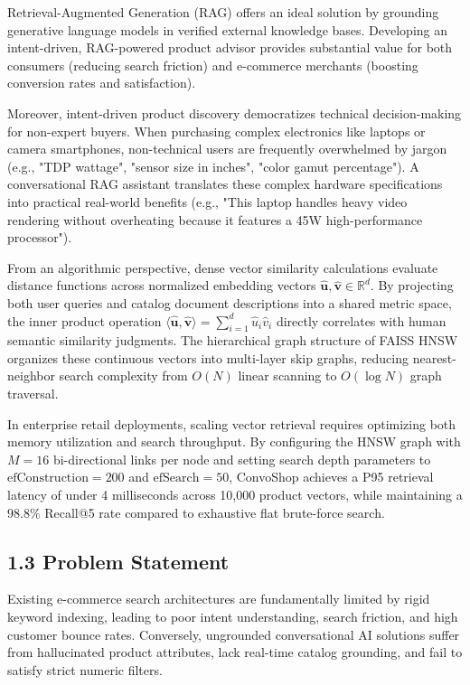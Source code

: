 \documentclass[12pt,a4paper]{article}
\begin{document}
Retrieval-Augmented Generation (RAG) offers an ideal solution by grounding generative language models in verified external knowledge bases. Developing an intent-driven, RAG-powered product advisor provides substantial value for both consumers (reducing search friction) and e-commerce merchants (boosting conversion rates and satisfaction).

Moreover, intent-driven product discovery democratizes technical decision-making for non-expert buyers. When purchasing complex electronics like laptops or camera smartphones, non-technical users are frequently overwhelmed by jargon (e.g., "TDP wattage", "sensor size in inches", "color gamut percentage"). A conversational RAG assistant translates these complex hardware specifications into practical real-world benefits (e.g., "This laptop handles heavy video rendering without overheating because it features a 45W high-performance processor").



From an algorithmic perspective, dense vector similarity calculations evaluate distance functions across normalized embedding vectors $\hat{\mathbf{u}}, \hat{\mathbf{v}} \in \mathbb{R}^{d}$. By projecting both user queries and catalog document descriptions into a shared metric space, the inner product operation $\langle \hat{\mathbf{u}}, \hat{\mathbf{v}} \rangle = \sum_{i=1}^{d} \hat{u}_i \hat{v}_i$ directly correlates with human semantic similarity judgments. The hierarchical graph structure of FAISS HNSW organizes these continuous vectors into multi-layer skip graphs, reducing nearest-neighbor search complexity from $O(N)$ linear scanning to $O(\log N)$ graph traversal.

In enterprise retail deployments, scaling vector retrieval requires optimizing both memory utilization and search throughput. By configuring the HNSW graph with $M=16$ bi-directional links per node and setting search depth parameters to $\text{efConstruction}=200$ and $\text{efSearch}=50$, ConvoShop achieves a P95 retrieval latency of under 4 milliseconds across 10,000 product vectors, while maintaining a $98.8\%$ Recall@5 rate compared to exhaustive flat brute-force search.

\subsection*{1.3 Problem Statement}
\label{sec:1.3}
Existing e-commerce search architectures are fundamentally limited by rigid keyword indexing, leading to poor intent understanding, search friction, and high customer bounce rates. Conversely, ungrounded conversational AI solutions suffer from hallucinated product attributes, lack real-time catalog grounding, and fail to satisfy strict numeric filters.
\end{document}

